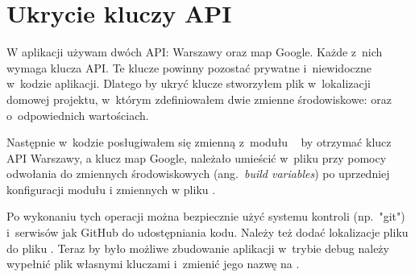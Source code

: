 \documentclass{SGGW-thesis}
\begin{document}
\section{Ukrycie kluczy API}
W aplikacji używam dwóch API: Warszawy oraz map Google.
Każde z~nich wymaga klucza API.
Te klucze powinny pozostać prywatne i~niewidoczne w~kodzie aplikacji.
Dlatego by ukryć klucze stworzyłem plik  w~lokalizacji domowej projektu, w~którym zdefiniowałem dwie zmienne środowiskowe:
 oraz  o~odpowiednich wartościach.

Następnie w~kodzie posługiwałem się zmienną  z~modułu ~\cite{REACTCONFIG} by otrzymać klucz API Warszawy,
a klucz map Google, należało umieścić w~pliku  przy pomocy odwołania do zmiennych środowiskowych (ang.~\textit{build variables}) po uprzedniej konfiguracji modułu  i zmiennych w pliku .

Po wykonaniu tych operacji można bezpiecznie użyć systemu kontroli (np.~"git") i~serwisów jak GitHub do udostępniania kodu.
Należy też dodać lokalizacje pliku  do pliku .
Teraz by było możliwe zbudowanie aplikacji w~trybie debug należy wypełnić plik  własnymi kluczami i~zmienić jego nazwę na .
\end{document}
